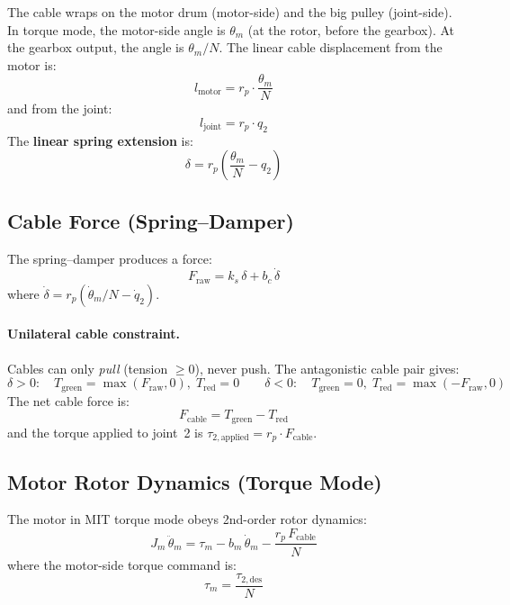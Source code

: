\documentclass[11pt, a4paper]{article}
\begin{document}
The cable wraps on the motor drum (motor-side) and the big pulley
(joint-side).  In torque mode, the motor-side angle is $\theta_m$
(at the rotor, before the gearbox).  At the gearbox output, the angle
is $\theta_m / N$.  The linear cable displacement from the motor is:
\[
l_\text{motor} = r_p \cdot \frac{\theta_m}{N}
\]
and from the joint:
\[
l_\text{joint} = r_p \cdot q_2
\]
The \textbf{linear spring extension} is:
\begin{equation}
\label{eq:delta}
\boxed{\delta = r_p \left(\frac{\theta_m}{N} - q_2\right)}
\end{equation}

\subsection{Cable Force (Spring--Damper)}

The spring--damper produces a force:
\begin{equation}
\label{eq:F-raw}
F_\text{raw} = k_s\,\delta + b_c\,\dot{\delta}
\end{equation}
where $\dot{\delta} = r_p \left(\dot{\theta}_m / N - \dot{q}_2\right)$.

\paragraph{Unilateral cable constraint.}
Cables can only \emph{pull} (tension $\ge 0$), never push.
The antagonistic cable pair gives:
\begin{equation}
\label{eq:cable-tensions}
\delta > 0: \quad T_\text{green} = \max(F_\text{raw}, 0),\; T_\text{red} = 0
\qquad
\delta < 0: \quad T_\text{green} = 0,\; T_\text{red} = \max(-F_\text{raw}, 0)
\end{equation}
The net cable force is:
\begin{equation}
\label{eq:F-cable}
F_\text{cable} = T_\text{green} - T_\text{red}
\end{equation}
and the torque applied to joint~2 is $\tau_{2,\text{applied}} = r_p \cdot F_\text{cable}$.

\subsection{Motor Rotor Dynamics (Torque Mode)}

The motor in MIT torque mode obeys 2nd-order rotor dynamics:
\begin{equation}
\label{eq:motor}
\boxed{J_m\,\ddot{\theta}_m = \tau_m - b_m\,\dot{\theta}_m - \frac{r_p\,F_\text{cable}}{N}}
\end{equation}
where the motor-side torque command is:
\[
\tau_m = \frac{\tau_{2,\text{des}}}{N}
\]
\end{document}
